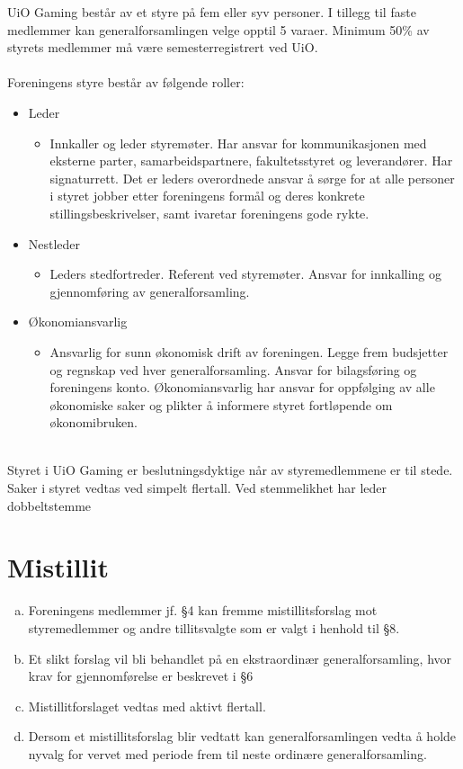 \documentclass[12pt,a4paper,norsk]{article}
\begin{document}
UiO Gaming består av et styre på fem eller syv personer. I tillegg til faste
medlemmer kan generalforsamlingen velge opptil 5 varaer. Minimum 50\% av styrets
medlemmer må være semesterregistrert ved UiO.
\\
\\
Foreningens styre består av følgende roller:
\begin{itemize}
    \item Leder
    \begin{itemize}
        \item Innkaller og leder styremøter. Har ansvar for kommunikasjonen med eksterne parter,
        samarbeidspartnere, fakultetsstyret og leverandører. Har signaturrett. Det er leders
        overordnede ansvar å sørge for at alle personer i styret jobber etter foreningens formål og deres
        konkrete stillingsbeskrivelser, samt ivaretar foreningens gode rykte.
    \end{itemize}

    \item Nestleder
    \begin{itemize}
        \item Leders stedfortreder. Referent ved styremøter. Ansvar for innkalling og gjennomføring
        av generalforsamling.
    \end{itemize}

    \item Økonomiansvarlig
    \begin{itemize}
        \item Ansvarlig for sunn økonomisk drift av foreningen. Legge frem budsjetter og regnskap ved
        hver generalforsamling. Ansvar for bilagsføring og foreningens konto. Økonomiansvarlig har
        ansvar for oppfølging av alle økonomiske saker og plikter å informere styret fortløpende om
        økonomibruken.
    \end{itemize}
\end{itemize}
\\
Styret i UiO Gaming er beslutningsdyktige når  av styremedlemmene er til stede. Saker i
styret vedtas ved simpelt flertall. Ved stemmelikhet har leder dobbeltstemme



\section{Mistillit}
\begin{enumerate}[a)]
    \item Foreningens medlemmer jf. §4 kan fremme mistillitsforslag mot styremedlemmer og andre tillitsvalgte som er valgt i henhold til §8.
    \item Et slikt forslag vil bli behandlet på en ekstraordinær generalforsamling, hvor krav for gjennomførelse er beskrevet i §6
    \item Mistillitforslaget vedtas med  aktivt flertall.
    \item Dersom et mistillitsforslag blir vedtatt kan generalforsamlingen vedta å holde nyvalg for vervet med periode frem til neste ordinære generalforsamling.
\end{enumerate}
\end{document}
